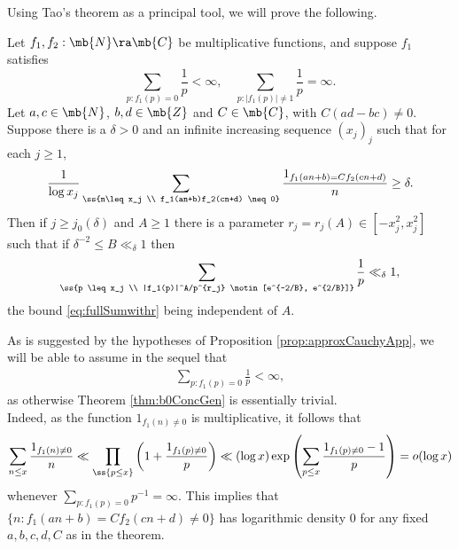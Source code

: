 Using Tao's theorem as a principal tool, we will prove the following.
%
\begin{prop}\label{prop:approxCauchyApp}
Let $f_1,f_2: \mb{N} \ra \mb{C}$ be multiplicative functions, and suppose $f_1$ satisfies
\begin{equation}\label{eq:01Both}
\sum_{p : f_1(p) = 0} \frac{1}{p} < \infty, \quad \sum_{p : |f_1(p)| \neq 1} \frac{1}{p} = \infty.
\end{equation}
Let $a,c \in \mb{N}$, $b,d \in \mb{Z}$ and $C \in \mb{C}$, with $C(ad - bc) \neq 0$. Suppose there is a $\delta > 0$ and an infinite increasing sequence $(x_j)_j$ such that for each $j \geq 1$,
\begin{equation}\label{eq:lowerBdAssump}
\frac{1}{\log x_j} \sum_{\ss{n\leq x_j \\ f_1(an+b)f_2(cn+d) \neq 0}} \frac{1_{f_1(an+b) = Cf_2(cn+d)}}{n} \geq \delta.
\end{equation}
Then if $j \geq j_0(\delta)$ and $A \geq 1$ there is a parameter $r_j = r_j(A) \in [-x_j^2,x_j^2]$ such that if $\delta^{-2} \leq B \ll_{\delta} 1$ then
%
%
%
%
%
%
\begin{equation}\label{eq:fullSumwithr}
\sum_{\ss{p \leq x_j  \\ |f_1(p)|^A/p^{r_j} \notin [e^{-2/B}, e^{2/B}]}} \frac{1}{p} \ll_{\delta} 1,
\end{equation}
the bound \eqref{eq:fullSumwithr} being independent of $A$.
\end{prop}
%
%
%
%
\begin{rem} \label{rem:thinF0red}
%
As is suggested by the hypotheses of Proposition \ref{prop:approxCauchyApp}, we will be able to assume in the sequel that
\begin{align}
\sum_{p: f_1(p) = 0} \frac{1}{p} < \infty, \label{eq:thinF0}
\end{align}
as otherwise Theorem \ref{thm:b0ConcGen} is essentially trivial. \\
Indeed, as the function $1_{f_1(n) \neq 0}$ is multiplicative, it follows
%
that
$$
\sum_{n \leq x} \frac{1_{f_1(n) \neq 0}}{n} \ll \prod_{\ss{p \leq x}} \left(1 + \frac{1_{f_1(p) \neq 0}}{p}\right) \ll (\log x) \exp\left(\sum_{p \leq x} \frac{1_{f_1(p) \neq 0} - 1}{p}\right)
= o(\log x)
$$
whenever $\sum_{p : f_1(p) = 0} p^{-1} = \infty$. This implies that $\{n: f_1(an+b) = Cf_2(cn+d) \neq 0\}$ has logarithmic density $0$ for any fixed $a,b,c,d,C$ as in the theorem.
%
%
%
%
%
%
%
\end{rem}

